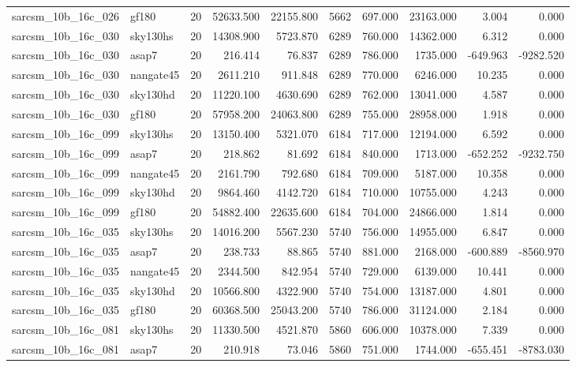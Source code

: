 \documentclass{article}
\begin{document}
\begin{longtable}{llrrrrrrrr}
sarcsm\_10b\_16c\_026 & gf180 & 20 & 52633.500 & 22155.800 & 5662 & 697.000 & 23163.000 & 3.004 & 0.000 \\
sarcsm\_10b\_16c\_030 & sky130hs & 20 & 14308.900 & 5723.870 & 6289 & 760.000 & 14362.000 & 6.312 & 0.000 \\
sarcsm\_10b\_16c\_030 & asap7 & 20 & 216.414 & 76.837 & 6289 & 786.000 & 1735.000 & -649.963 & -9282.520 \\
sarcsm\_10b\_16c\_030 & nangate45 & 20 & 2611.210 & 911.848 & 6289 & 770.000 & 6246.000 & 10.235 & 0.000 \\
sarcsm\_10b\_16c\_030 & sky130hd & 20 & 11220.100 & 4630.690 & 6289 & 762.000 & 13041.000 & 4.587 & 0.000 \\
sarcsm\_10b\_16c\_030 & gf180 & 20 & 57958.200 & 24063.800 & 6289 & 755.000 & 28958.000 & 1.918 & 0.000 \\
sarcsm\_10b\_16c\_099 & sky130hs & 20 & 13150.400 & 5321.070 & 6184 & 717.000 & 12194.000 & 6.592 & 0.000 \\
sarcsm\_10b\_16c\_099 & asap7 & 20 & 218.862 & 81.692 & 6184 & 840.000 & 1713.000 & -652.252 & -9232.750 \\
sarcsm\_10b\_16c\_099 & nangate45 & 20 & 2161.790 & 792.680 & 6184 & 709.000 & 5187.000 & 10.358 & 0.000 \\
sarcsm\_10b\_16c\_099 & sky130hd & 20 & 9864.460 & 4142.720 & 6184 & 710.000 & 10755.000 & 4.243 & 0.000 \\
sarcsm\_10b\_16c\_099 & gf180 & 20 & 54882.400 & 22635.600 & 6184 & 704.000 & 24866.000 & 1.814 & 0.000 \\
sarcsm\_10b\_16c\_035 & sky130hs & 20 & 14016.200 & 5567.230 & 5740 & 756.000 & 14955.000 & 6.847 & 0.000 \\
sarcsm\_10b\_16c\_035 & asap7 & 20 & 238.733 & 88.865 & 5740 & 881.000 & 2168.000 & -600.889 & -8560.970 \\
sarcsm\_10b\_16c\_035 & nangate45 & 20 & 2344.500 & 842.954 & 5740 & 729.000 & 6139.000 & 10.441 & 0.000 \\
sarcsm\_10b\_16c\_035 & sky130hd & 20 & 10566.800 & 4322.900 & 5740 & 754.000 & 13187.000 & 4.801 & 0.000 \\
sarcsm\_10b\_16c\_035 & gf180 & 20 & 60368.500 & 25043.200 & 5740 & 786.000 & 31124.000 & 2.184 & 0.000 \\
sarcsm\_10b\_16c\_081 & sky130hs & 20 & 11330.500 & 4521.870 & 5860 & 606.000 & 10378.000 & 7.339 & 0.000 \\
sarcsm\_10b\_16c\_081 & asap7 & 20 & 210.918 & 73.046 & 5860 & 751.000 & 1744.000 & -655.451 & -8783.030 \\

\end{longtable}
\end{document}
